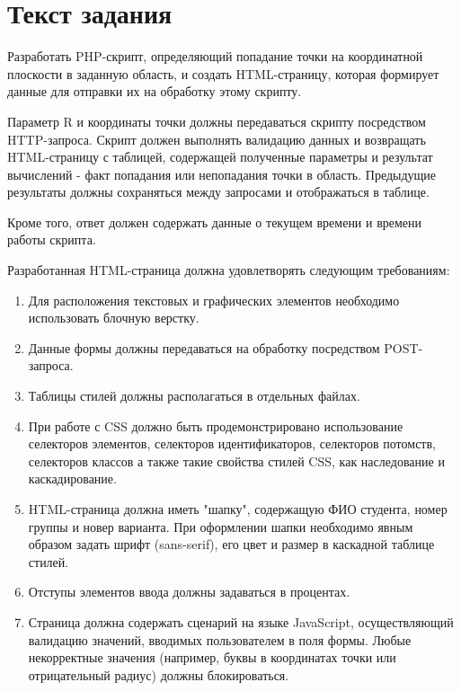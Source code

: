 \documentclass{article}
\begin{document}
\itmo[
  variant=371371,
  labn=1,
  discipline=Веб-программирование,
  group=P3215,
  student=Владимир Мацюк,
  teacher=Кустарев Иван Павлович,
  year=2023,
  logo=../../lib/img/itmo.png
]

\section{Текст задания}
Разработать PHP-скрипт, определяющий попадание точки на координатной плоскости в заданную область, и создать HTML-страницу, которая формирует данные для отправки их на обработку этому скрипту.

Параметр R и координаты точки должны передаваться скрипту посредством HTTP-запроса. Скрипт должен выполнять валидацию данных и возвращать HTML-страницу с таблицей, содержащей полученные параметры и результат вычислений - факт попадания или непопадания точки в область. Предыдущие результаты должны сохраняться между запросами и отображаться в таблице.

Кроме того, ответ должен содержать данные о текущем времени и времени работы скрипта.

Разработанная HTML-страница должна удовлетворять следующим требованиям:

\begin{enumerate}
  \item Для расположения текстовых и графических элементов необходимо использовать блочную верстку.
  \item Данные формы должны передаваться на обработку посредством POST-запроса.
  \item Таблицы стилей должны располагаться в отдельных файлах.
  \item При работе с CSS должно быть продемонстрировано использование селекторов элементов, селекторов идентификаторов, селекторов потомств, селекторов классов а также такие свойства стилей CSS, как наследование и каскадирование.
  \item HTML-страница должна иметь "шапку", содержащую ФИО студента, номер группы и новер варианта. При оформлении шапки необходимо явным образом задать шрифт (sans-serif), его цвет и размер в каскадной таблице стилей.
  \item Отступы элементов ввода должны задаваться в процентах.
  \item Страница должна содержать сценарий на языке JavaScript, осуществляющий валидацию значений, вводимых пользователем в поля формы. Любые некорректные значения (например, буквы в координатах точки или отрицательный радиус) должны блокироваться.
\end{enumerate}
\end{document}
